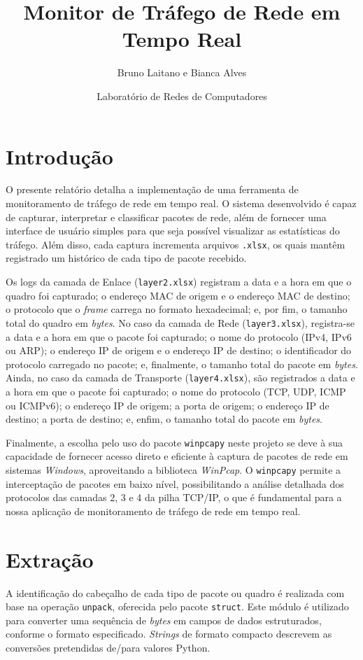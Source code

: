 \documentclass[12pt]{article}
\title{\textbf{Monitor de Tráfego de Rede em Tempo Real}}
\date{Laboratório de Redes de Computadores}
\author{Bruno Laitano e Bianca Alves}
\begin{document}
\maketitle

\section{Introdução}
O presente relatório detalha a implementação de uma ferramenta de monitoramento de tráfego de rede em tempo real. O sistema desenvolvido é capaz de capturar, interpretar e classificar pacotes de rede, além de fornecer uma interface de usuário simples para que seja possível visualizar as estatísticas do tráfego. Além disso, cada captura incrementa arquivos \texttt{.xlsx}, os quais mantêm registrado um histórico de cada tipo de pacote recebido.

\quad Os logs da camada de Enlace (\texttt{layer2.xlsx}) registram a data e a hora em que o quadro foi capturado; o endereço MAC de origem e o endereço MAC de destino; o protocolo que o \emph{frame} carrega no formato hexadecimal; e, por fim, o tamanho total do quadro em \emph{bytes}. No caso da camada de Rede (\texttt{layer3.xlsx}), registra-se a data e a hora em que o pacote foi capturado; o nome do protocolo (IPv4, IPv6 ou ARP); o endereço IP de origem e o endereço IP de destino; o identificador do protocolo carregado no pacote; e, finalmente, o tamanho total do pacote em \emph{bytes}. Ainda, no caso da camada de Transporte (\texttt{layer4.xlsx}), são registrados a data e a hora em que o pacote foi capturado; o nome do protocolo (TCP, UDP, ICMP ou ICMPv6); o endereço IP de origem; a porta de origem; o endereço IP de destino; a porta de destino; e, enfim, o tamanho total do pacote em \emph{bytes}.

\quad Finalmente, a escolha pelo uso do pacote \texttt{winpcapy} neste projeto se deve à sua capacidade de fornecer acesso direto e eficiente à captura de pacotes de rede em sistemas \emph{Windows}, aproveitando a biblioteca \emph{WinPcap}. O \texttt{winpcapy} permite a interceptação de pacotes em baixo nível, possibilitando a análise detalhada dos protocolos das camadas 2, 3 e 4 da pilha TCP/IP, o que é fundamental para a nossa aplicação de monitoramento de tráfego de rede em tempo real.

\section{Extração}
A identificação do cabeçalho de cada tipo de pacote ou quadro é realizada com base na operação \texttt{unpack}, oferecida pelo pacote \texttt{struct}. Este módulo é utilizado para converter uma sequência de \emph{bytes} em campos de dados estruturados, conforme o formato especificado. \emph{Strings} de formato compacto descrevem as conversões pretendidas de/para valores Python.
\end{document}
